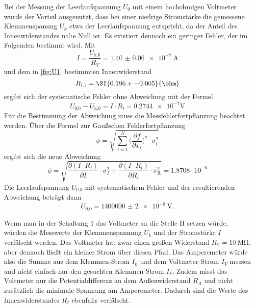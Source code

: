   \newpage

  Bei der Messung der Leerlaufspannung $U_0$ mit einem hochohmigen Voltmeter
  wurde der Vorteil ausgenutzt, dass bei einer niedrige Stromstärke die
  gemessene Klemmenspanung $U_k$ etwa der Leerlaufspannung entspricht, da
  der Anteil des Innenwiderstandes nahe Null ist.
  Es existiert dennoch ein geringer Fehler, der im Folgenden bestimmt wird.
  Mit
  \begin{equation}
    I = \frac{U_\text{k,0}}{R_V} = \SI{1.40(6)e-7}{\A}
  \end{equation}
  und dem in \ref{fig:U1} bestimmten Innenwiderstand
  \begin{equation}
    R_\text{i,1} = \SI{0.196 +- 0.005}{\ohm}
  \end{equation}
  ergibt sich der systematische Fehler ohne Abweichung mit der Formel
  \begin{equation}
    U_\text{0,0} - U_\text{k,0} = I \cdot R_i = \num{0.2744e-7} \si{\V}
  \end{equation}
  Für die Bestimmung der Abweichung muss die Messfehlerfortpflanzung
  beachtet werden. Über die Formel zur Gaußschen Fehlerfortpflanzung
  \begin{equation}
    \phi = \sqrt{\sum_{i=1}^{N} \biggl(\frac{\partial f}{\partial x_i}\biggr)^2
    \cdot \sigma_i^2}
  \end{equation}
  ergibt sich die neue Abweichung
  \begin{equation}
    \phi = \sqrt{\frac{\partial(I \cdot R_i)}{\partial I} \cdot \sigma_I^2
    + \frac{\partial(I \cdot R_i)}{\partial R_i} \cdot \sigma_\text{R}^2}
    = 1.8708 \cdot 10^{-6}
  \end{equation}
  Die Leerlaufspannung $U_\text{0,0}$ mit systematischem Fehler und der
  resultierenden Abweichung beträgt dann
  \begin{equation}
    U_\text{0,0} = \SI{1400000(2)e-6}{\V}.
  \end{equation}

  Wenn man in der Schaltung 1 das Voltmeter an die Stelle H
  setzen würde, würden die Messwerte der Klemmenspannung $U_k$ und der
  Stromstärke $I$ verfälscht werden. Das Voltmeter hat zwar einen großen
  Widerstand $R_V = \SI{10}{\mega\ohm}$, aber dennoch fließt ein kleiner Strom
  über diesen Pfad. Das Amperemeter würde also die Summe aus dem
  Klemmen-Strom $I_k$ und dem Voltmeter-Strom $I_V$ messen und nicht einfach
  nur den gesuchten Klemmen-Strom $I_k$.
  Zudem misst das Voltmeter nur die Potentialdifferenz an dem Außenwiderstand
  $R_A$ und nicht zusätzlich die minimale Spannung am Amperemeter. Dadurch
  sind die Werte des Innenwiderstandes $R_I$ ebenfalls verfälscht.

